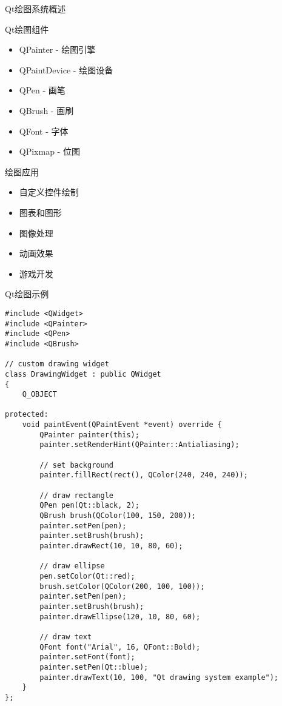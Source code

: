 \documentclass[UTF8,aspectratio=169]{beamer}
\begin{document}
\begin{frame}{Qt绘图系统概述}
    \begin{block}{Qt绘图组件}
        \begin{itemize}
            \item QPainter - 绘图引擎
            \item QPaintDevice - 绘图设备
            \item QPen - 画笔
            \item QBrush - 画刷
            \item QFont - 字体
            \item QPixmap - 位图
        \end{itemize}
    \end{block}

    \begin{block}{绘图应用}
        \begin{itemize}
            \item 自定义控件绘制
            \item 图表和图形
            \item 图像处理
            \item 动画效果
            \item 游戏开发
        \end{itemize}
    \end{block}
\end{frame}

\begin{frame}[fragile]{Qt绘图示例}
    \begin{lstlisting}
#include <QWidget>
#include <QPainter>
#include <QPen>
#include <QBrush>

// custom drawing widget
class DrawingWidget : public QWidget
{
    Q_OBJECT

protected:
    void paintEvent(QPaintEvent *event) override {
        QPainter painter(this);
        painter.setRenderHint(QPainter::Antialiasing);

        // set background
        painter.fillRect(rect(), QColor(240, 240, 240));

        // draw rectangle
        QPen pen(Qt::black, 2);
        QBrush brush(QColor(100, 150, 200));
        painter.setPen(pen);
        painter.setBrush(brush);
        painter.drawRect(10, 10, 80, 60);

        // draw ellipse
        pen.setColor(Qt::red);
        brush.setColor(QColor(200, 100, 100));
        painter.setPen(pen);
        painter.setBrush(brush);
        painter.drawEllipse(120, 10, 80, 60);

        // draw text
        QFont font("Arial", 16, QFont::Bold);
        painter.setFont(font);
        painter.setPen(Qt::blue);
        painter.drawText(10, 100, "Qt drawing system example");
    }
};
    \end{lstlisting}
\end{frame}
\end{document}
